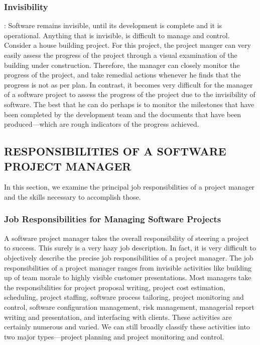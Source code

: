 \documentclass[12pt]{article}
\begin{document}
\subsubsection{Invisibility}
: Software remains invisible, until its development is complete
and it is operational. Anything that is invisible, is difficult to manage and
control. Consider a house building project. For this project, the project
manger can very easily assess the progress of the project through a visual
examination of the building under construction. Therefore, the manager can
closely monitor the progress of the project, and take remedial actions
whenever he finds that the progress is not as per plan. In contrast, it
becomes very difficult for the manager of a software project to assess the
progress of the project due to the invisibility of software. The best that he
can do perhaps is to monitor the milestones that have been completed by the
development team and the documents that have been produced—which are
rough indicators of the progress achieved.
\subsection{RESPONSIBILITIES OF A SOFTWARE PROJECT MANAGER}
In this section, we examine the principal job responsibilities of a project
manager and the skills necessary to accomplish those.
\subsubsection{Job Responsibilities for Managing Software Projects}
A software project manager takes the overall responsibility of steering a
project to success. This surely is a very hazy job description. In fact, it is very
difficult to objectively describe the precise job responsibilities of a project
manager. The job responsibilities of a project manager ranges from invisible
activities like building up of team morale to highly visible customer
presentations. Most managers take the responsibilities for project proposal
writing, project cost estimation, scheduling, project staffing, software process
tailoring, project monitoring and control, software configuration management,
risk management, managerial report writing and presentation, and interfacing
with clients. These activities are certainly numerous and varied. We can still
broadly classify these activities into two major types—project planning and
project monitoring and control.
\pagebreak
\end{document}
